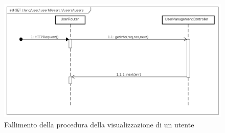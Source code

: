 \begin{itemize}
\begin{figure}[ht]
	\centering
	\includegraphics[scale=0.45]{UML/DiagrammiDiSequenza/Back-end/GET__lang_user__userId_search_users__users_failure.png}
	\caption{Fallimento della procedura della visualizzazione di un utente}
\end{figure}
\FloatBarrier

\end{itemize}





